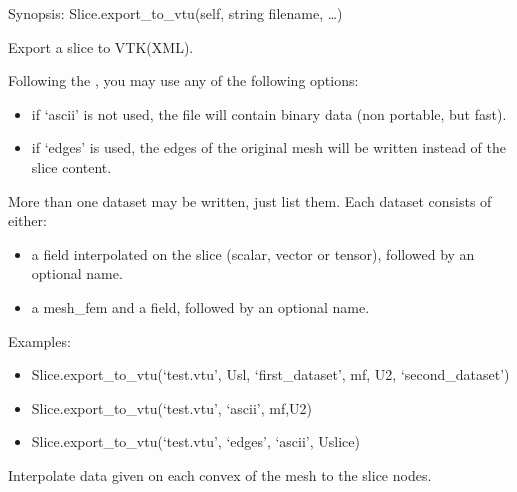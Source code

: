 \documentclass[a4paper,11pt,english]{sphinxmanual}
\begin{document}
\begin{fulllineitems}
\begin{fulllineitems}
\label{\detokenize{python/cmdref_Slice:getfem.Slice.export_to_vtu}}
Synopsis: Slice.export\_to\_vtu(self, string filename, …)

Export a slice to VTK(XML).

Following the , you may use any of the following options:
\begin{itemize}
\item {} 
if ‘ascii’ is not used, the file will contain binary data
(non portable, but fast).

\item {} 
if ‘edges’ is used, the edges of the original mesh will be
written instead of the slice content.

\end{itemize}

More than one dataset may be written, just list them. Each dataset
consists of either:
\begin{itemize}
\item {} 
a field interpolated on the slice (scalar, vector or tensor),
followed by an optional name.

\item {} 
a mesh\_fem and a field, followed by an optional name.

\end{itemize}

Examples:
\begin{itemize}
\item {} 
Slice.export\_to\_vtu(‘test.vtu’, Usl, ‘first\_dataset’, mf,
U2, ‘second\_dataset’)

\item {} 
Slice.export\_to\_vtu(‘test.vtu’, ‘ascii’, mf,U2)

\item {} 
Slice.export\_to\_vtu(‘test.vtu’, ‘edges’, ‘ascii’, Uslice)

\end{itemize}

\end{fulllineitems}


\begin{fulllineitems}
\label{\detokenize{python/cmdref_Slice:getfem.Slice.interpolate_convex_data}}
Interpolate data given on each convex of the mesh to the slice nodes.


\end{fulllineitems}
\end{fulllineitems}
\end{document}
